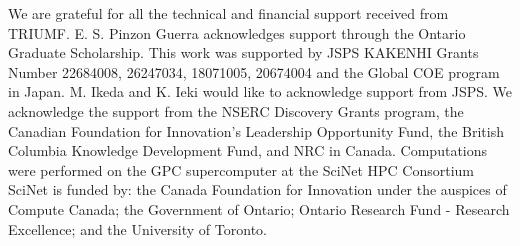 \documentclass[%
 reprint,
showpacs,
 amsmath,amssymb,
 aps,
 prc,
]{revtex4-1}
\begin{document}
\maketitle










\begin{acknowledgments}
We are grateful for all the technical and financial support received from TRIUMF.
E. S. Pinzon Guerra acknowledges support through the Ontario Graduate Scholarship.
This work was supported by JSPS KAKENHI Grants Number 22684008, 26247034, 18071005, 20674004
and the Global COE program in Japan. M. Ikeda and K. Ieki would like to acknowledge support from JSPS.
We acknowledge the support from the NSERC Discovery Grants program, the Canadian Foundation for Innovation’s
Leadership Opportunity Fund, the British Columbia Knowledge Development Fund, and NRC in Canada.
Computations were performed on the GPC supercomputer at the SciNet HPC Consortium \cite{scinet}
SciNet is funded by: the Canada Foundation for Innovation under the auspices of Compute Canada; 
the Government of Ontario; Ontario Research Fund - Research Excellence; and the University of Toronto.
\end{acknowledgments}


\end{document}
